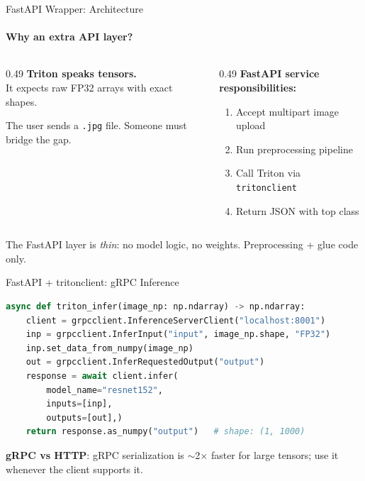 \documentclass[aspectratio=169]{beamer}
\newcommand{\dbox}[1]{
\begin{mdframed}[roundcorner=3pt, backgroundcolor=yellow, linewidth=0]
\vspace{1mm}
{#1}
\vspace{1mm}
\end{mdframed}
}
\begin{document}
\begin{frame}[t]{FastAPI Wrapper: Architecture}
\framesubtitle{Why an extra API layer?}
\begin{columns}[T,onlytextwidth]
    \begin{column}{0.49\textwidth}
        \textbf{Triton speaks tensors.}\\
        It expects raw FP32 arrays with exact shapes.
        \vspace{3mm}

        The user sends a \texttt{.jpg} file.
        Someone must bridge the gap.
    \end{column}
    \begin{column}{0.49\textwidth}
        \textbf{FastAPI service responsibilities:}
        \begin{enumerate}
            \item Accept multipart image upload
            \item Run preprocessing pipeline
            \item Call Triton via \texttt{tritonclient}
            \item Return JSON with top class
        \end{enumerate}
    \end{column}
\end{columns}
\vspace{3mm}
\dbox{The FastAPI layer is \textit{thin}: no model logic, no weights. Preprocessing + glue code only.}
\end{frame}

\begin{frame}[t,fragile]{FastAPI + tritonclient: gRPC Inference}
\vspace*{-0.5cm}
\begin{lstlisting}[language=Python, basicstyle=\footnotesize\ttfamily]
async def triton_infer(image_np: np.ndarray) -> np.ndarray:
    client = grpcclient.InferenceServerClient("localhost:8001")
    inp = grpcclient.InferInput("input", image_np.shape, "FP32")
    inp.set_data_from_numpy(image_np)
    out = grpcclient.InferRequestedOutput("output")
    response = await client.infer(
        model_name="resnet152",
        inputs=[inp],
        outputs=[out],)
    return response.as_numpy("output")   # shape: (1, 1000)
\end{lstlisting}
\textbf{gRPC vs HTTP}: gRPC serialization is $\sim$2$\times$ faster for large tensors; use it whenever the client supports it.
\end{frame}
\end{document}
